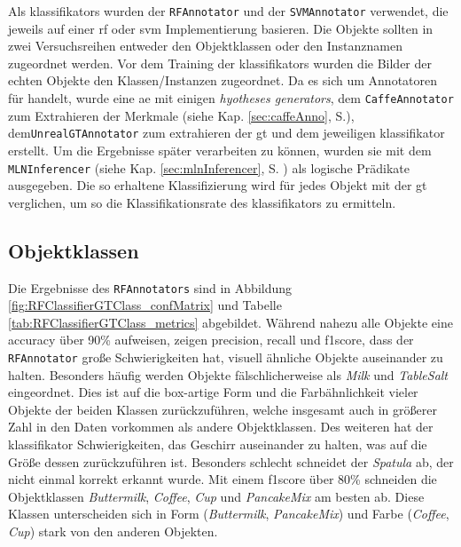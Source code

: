 Als \glspl{klassifikator} wurden der \texttt{RFAnnotator} und der \texttt{SVMAnnotator} verwendet, die jeweils auf einer \gls{rf} oder \gls{svm} Implementierung basieren. Die Objekte sollten in zwei Versuchsreihen entweder den Objektklassen oder den Instanznamen zugeordnet werden. Vor dem Training der \glspl{klassifikator} wurden die Bilder der echten Objekte den Klassen/Instanzen zugeordnet. Da es sich um Annotatoren für \robosherlock handelt, wurde eine \gls{ae} mit einigen \textit{hyotheses generators}, dem \texttt{CaffeAnnotator} zum Extrahieren der Merkmale (siehe Kap. \ref{sec:caffeAnno}, S.\pageref{sec:caffeAnno}), dem\linebreak \texttt{UnrealGTAnnotator} zum extrahieren der \gls{gt} und dem jeweiligen \gls{klassifikator} erstellt. Um die Ergebnisse später verarbeiten zu können, wurden sie mit dem \texttt{MLNInferencer} (siehe Kap. \ref{sec:mlnInferencer}, S. \pageref{sec:mlnInferencer}) als logische Prädikate ausgegeben. Die so erhaltene Klassifizierung wird für jedes Objekt mit der \gls{gt} verglichen, um so die Klassifikationsrate des \gls{klassifikator}s zu ermitteln.


\subsection{Objektklassen}
Die Ergebnisse des \texttt{RFAnnotators} sind in Abbildung \ref{fig:RFClassifierGTClass_confMatrix} und Tabelle \ref{tab:RFClassifierGTClass_metrics} abgebildet. Während nahezu alle Objekte eine \gls{accuracy} über 90\% aufweisen, zeigen \gls{precision}, \gls{recall} und \gls{f1score}, dass der \texttt{RFAnnotator} große Schwierigkeiten hat, visuell ähnliche Objekte auseinander zu halten. Besonders häufig werden Objekte fälschlicherweise als \textit{Milk} und \textit{TableSalt} eingeordnet. Dies ist auf die box-artige Form und die Farbähnlichkeit vieler Objekte der beiden Klassen zurückzuführen, welche insgesamt auch in größerer Zahl in den Daten vorkommen als andere Objektklassen. Des weiteren hat der \gls{klassifikator} Schwierigkeiten, das Geschirr auseinander zu halten, was auf die Größe dessen zurückzuführen ist. Besonders schlecht schneidet der \textit{Spatula} ab, der nicht einmal korrekt erkannt wurde. Mit einem \gls{f1score} über 80\% schneiden die Objektklassen \textit{Buttermilk}, \textit{Coffee}, \textit{Cup} und \textit{PancakeMix} am besten ab. Diese Klassen unterscheiden sich in Form (\textit{Buttermilk}, \textit{PancakeMix}) und Farbe (\textit{Coffee}, \textit{Cup}) stark von den anderen Objekten.  \par


